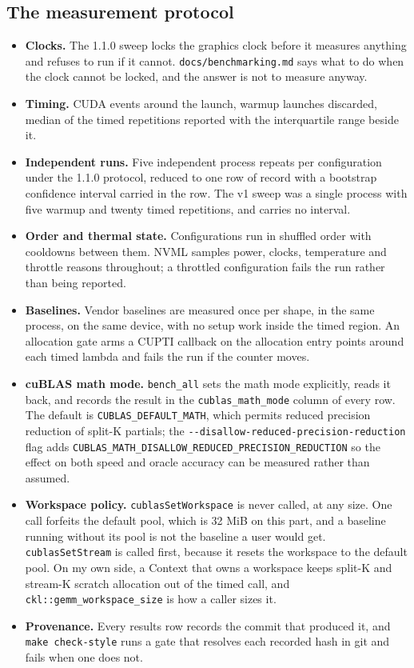 \subsection{The measurement protocol}

\begin{itemize}
\item \textbf{Clocks.} The 1.1.0 sweep locks the graphics clock before it measures
      anything and refuses to run if it cannot. \texttt{docs/benchmarking.md} says
      what to do when the clock cannot be locked, and the answer is not to measure
      anyway.
\item \textbf{Timing.} CUDA events around the launch, warmup launches discarded,
      median of the timed repetitions reported with the interquartile range beside
      it.
\item \textbf{Independent runs.} Five independent process repeats per
      configuration under the 1.1.0 protocol, reduced to one row of record with a
      bootstrap confidence interval carried in the row. The v1 sweep was a single
      process with five warmup and twenty timed repetitions, and carries no
      interval.
\item \textbf{Order and thermal state.} Configurations run in shuffled order with
      cooldowns between them. NVML samples power, clocks, temperature and throttle
      reasons throughout; a throttled configuration fails the run rather than being
      reported.
\item \textbf{Baselines.} Vendor baselines are measured once per shape, in the same
      process, on the same device, with no setup work inside the timed region. An
      allocation gate arms a CUPTI callback on the allocation entry points around
      each timed lambda and fails the run if the counter moves.
\item \textbf{cuBLAS math mode.} \texttt{bench\_all} sets the math mode explicitly,
      reads it back, and records the result in the \texttt{cublas\_math\_mode}
      column of every row. The default is \texttt{CUBLAS\_DEFAULT\_MATH}, which
      permits reduced precision reduction of split-K partials; the
      \texttt{-{}-disallow-reduced-precision-reduction} flag adds
      \texttt{CUBLAS\_MATH\_DISALLOW\_REDUCED\_PRECISION\_REDUCTION} so the effect
      on both speed and oracle accuracy can be measured rather than assumed.
\item \textbf{Workspace policy.} \texttt{cublasSetWorkspace} is never called, at
      any size. One call forfeits the default pool, which is 32 MiB on this part,
      and a baseline running without its pool is not the baseline a user would get.
      \texttt{cublasSetStream} is called first, because it resets the workspace to
      the default pool. On my own side, a Context that owns a workspace keeps
      split-K and stream-K scratch allocation out of the timed call, and
      \texttt{ckl::gemm\_workspace\_size} is how a caller sizes it.
\item \textbf{Provenance.} Every results row records the commit that produced it,
      and \texttt{make check-style} runs a gate that resolves each recorded hash in
      git and fails when one does not.
\end{itemize}

